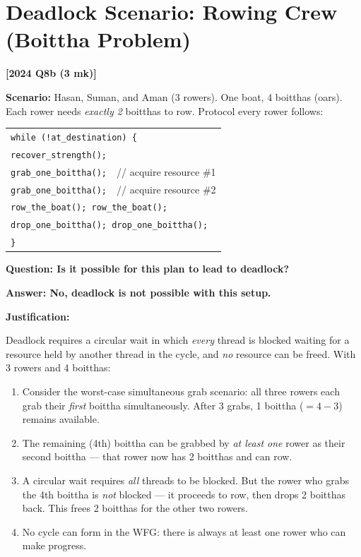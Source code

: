 \documentclass[11pt,a4paper]{article}
\newcommand{\qref}[1]{\textbf{\textcolor{examblue}{[#1]}}}
\newcommand{\mk}[1]{\textcolor{slidegray}{\small(#1 mk)}}
\begin{document}
\section{Deadlock Scenario: Rowing Crew (Boittha Problem)}
\qref{2024 Q8b \mk{3}}

\begin{answerbox}
\textbf{Scenario:} Hasan, Suman, and Aman (3 rowers). One boat, 4 boitthas (oars). Each rower needs \emph{exactly 2} boitthas to row. Protocol every rower follows:

\begin{center}
\begin{tabular}{l}
\texttt{while (!at\_destination) \{} \\
\quad\texttt{recover\_strength();} \\
\quad\texttt{grab\_one\_boittha();}~~// acquire resource \#1 \\
\quad\texttt{grab\_one\_boittha();}~~// acquire resource \#2 \\
\quad\texttt{row\_the\_boat(); row\_the\_boat();} \\
\quad\texttt{drop\_one\_boittha(); drop\_one\_boittha();} \\
\texttt{\}}
\end{tabular}
\end{center}

\textbf{Question: Is it possible for this plan to lead to deadlock?}

\textbf{Answer: No, deadlock is not possible with this setup.}

\textbf{Justification:}

Deadlock requires a circular wait in which \emph{every} thread is blocked waiting for a resource held by another thread in the cycle, and \emph{no} resource can be freed. With 3 rowers and 4 boitthas:

\begin{enumerate}
  \item Consider the worst-case simultaneous grab scenario: all three rowers each grab their \emph{first} boittha simultaneously. After 3 grabs, 1 boittha ($= 4 - 3$) remains available.
  \item The remaining (4th) boittha can be grabbed by \emph{at least one} rower as their second boittha --- that rower now has 2 boitthas and can row.
  \item A circular wait requires \emph{all} threads to be blocked. But the rower who grabs the 4th boittha is \emph{not} blocked --- it proceeds to row, then drops 2 boitthas back. This frees 2 boitthas for the other two rowers.
  \item No cycle can form in the WFG: there is always at least one rower who can make progress.
\end{enumerate}


\end{answerbox}
\end{document}
